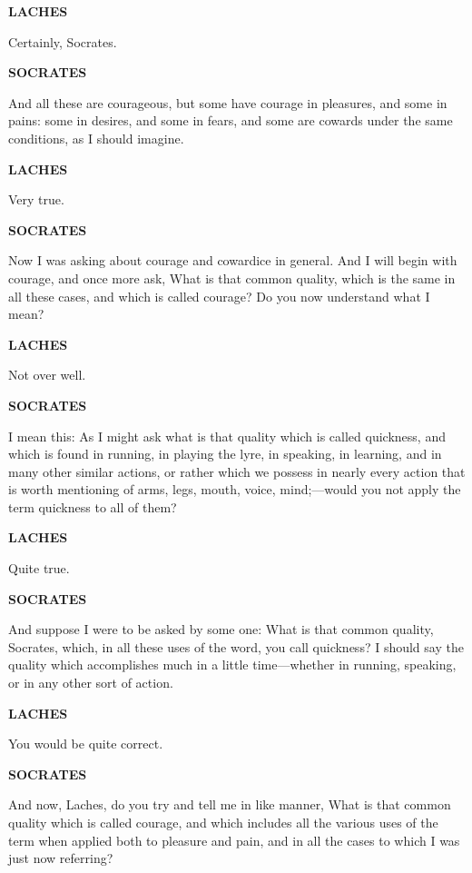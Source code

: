 \documentclass[11pt,letter]{book}
\begin{document}
\par \textbf{LACHES}
\par   Certainly, Socrates.

\par \textbf{SOCRATES}
\par   And all these are courageous, but some have courage in pleasures, and some in pains:  some in desires, and some in fears, and some are cowards under the same conditions, as I should imagine.

\par \textbf{LACHES}
\par   Very true.

\par \textbf{SOCRATES}
\par   Now I was asking about courage and cowardice in general. And I will begin with courage, and once more ask, What is that common quality, which is the same in all these cases, and which is called courage? Do you now understand what I mean?

\par \textbf{LACHES}
\par   Not over well.

\par \textbf{SOCRATES}
\par   I mean this:  As I might ask what is that quality which is called quickness, and which is found in running, in playing the lyre, in speaking, in learning, and in many other similar actions, or rather which we possess in nearly every action that is worth mentioning of arms, legs, mouth, voice, mind;—would you not apply the term quickness to all of them?

\par \textbf{LACHES}
\par   Quite true.

\par \textbf{SOCRATES}
\par   And suppose I were to be asked by some one:  What is that common quality, Socrates, which, in all these uses of the word, you call quickness? I should say the quality which accomplishes much in a little time—whether in running, speaking, or in any other sort of action.

\par \textbf{LACHES}
\par   You would be quite correct.

\par \textbf{SOCRATES}
\par   And now, Laches, do you try and tell me in like manner, What is that common quality which is called courage, and which includes all the various uses of the term when applied both to pleasure and pain, and in all the cases to which I was just now referring?
\end{document}
